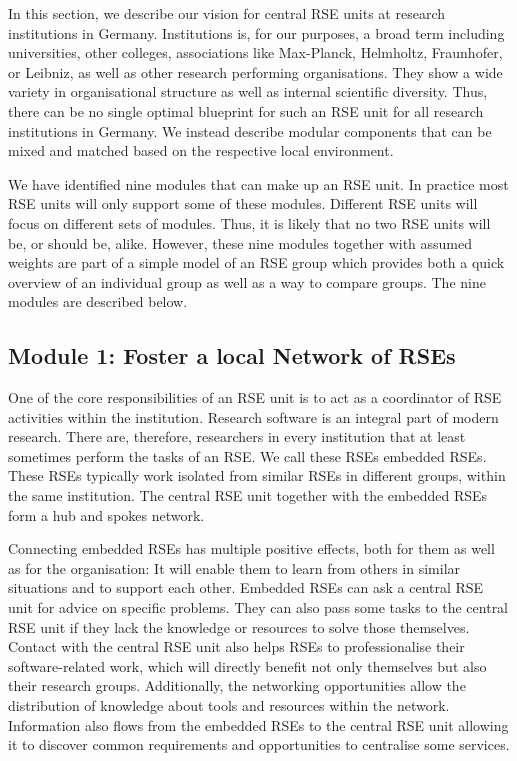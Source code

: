 \documentclass[a4paper]{article}
\begin{document}
In this section, we describe our vision for central RSE units at research institutions in Germany.
Institutions is, for our purposes, a broad term including universities, other colleges, associations like Max-Planck, Helmholtz, Fraunhofer, or Leibniz, as well as other research performing organisations.
They show a wide variety in organisational structure as well as internal scientific diversity.
Thus, there can be no single optimal blueprint for such an RSE unit for all research institutions in Germany.
We instead describe modular components that can be mixed and matched based on the respective local environment.

We have identified nine modules that can make up an RSE unit.
In practice most RSE units will only support some of these modules.
Different RSE units will focus on different sets of modules.
Thus, it is likely that no two RSE units will be, or should be, alike.
However, these nine modules together with assumed weights are part of a simple model of an RSE group which provides both a quick overview of an individual group as well as a way to compare groups.
The nine modules are described below.

\subsection{Module 1: Foster a local Network of RSEs}%
\label{sec:network}

One of the core responsibilities of an RSE unit is to act as a coordinator of RSE activities within the institution.
Research software is an integral part of modern research.
There are, therefore, researchers in every institution that at least sometimes perform the tasks of an RSE\@.
We call these RSEs embedded RSEs.
These RSEs typically work isolated from similar RSEs in different groups, within the same institution.
The central RSE unit together with the embedded RSEs form a hub and spokes network.

Connecting embedded RSEs has multiple positive effects, both for them as well as for the organisation:
It will enable them to learn from others in similar situations and to support each other.
Embedded RSEs can ask a central RSE unit for advice on specific problems.
They can also pass some tasks to the central RSE unit if they lack the knowledge or resources to solve those themselves.
Contact with the central RSE unit also helps RSEs to professionalise their software-related work, which will directly benefit not only themselves but also their research groups.
Additionally, the networking opportunities allow the distribution of knowledge about tools and resources within the network.
Information also flows from the embedded RSEs to the central RSE unit allowing it to discover common requirements and opportunities to centralise some services.
\end{document}
